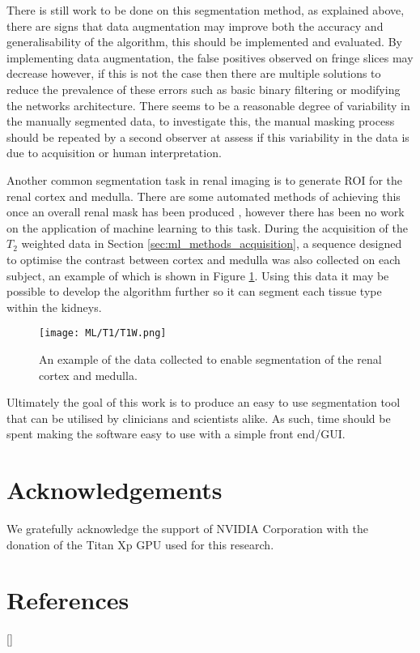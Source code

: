 There is still work to be done on this segmentation method, as explained above, there are signs that data augmentation may improve both the accuracy and generalisability of the algorithm, this should be implemented and evaluated. By implementing data augmentation, the false positives observed on fringe slices may decrease however, if this is not the case then there are multiple solutions to reduce the prevalence of these errors such as basic binary filtering or modifying the networks architecture. There seems to be a reasonable degree of variability in the manually segmented data, to investigate this, the manual masking process should be repeated by a second observer at assess if this variability in the data is due to acquisition or human interpretation.

Another common segmentation task in renal imaging is to generate \ac{ROI} for the renal cortex and medulla. There are some automated methods of achieving this once an overall renal mask has been produced \cite{cox_multiparametric_2017}, however there has been no work on the application of machine learning to this task. During the acquisition of the $T_2$ weighted data in Section \ref{sec:ml_methods_acquisition}, a sequence designed to optimise the contrast between cortex and medulla was also collected on each subject, an example of which is shown in Figure \ref{fig:ml_t1}. Using this data it may be possible to develop the algorithm further so it can segment each tissue type within the kidneys.

\begin{figure}[H]
	\centering
	\texttt{[image: ML/T1/T1W.png]}
	\caption{An example of the data collected to enable segmentation of the renal cortex and medulla.}
	\label{fig:ml_t1}
\end{figure}

Ultimately the goal of this work is to produce an easy to use segmentation tool that can be utilised by clinicians and scientists alike. As such, time should be spent making the software easy to use with a simple front end/\ac{GUI}.

\section{Acknowledgements}

We gratefully acknowledge the support of NVIDIA Corporation with the donation of the Titan Xp GPU used for this research.

\newpage
\section{References}
[\refname]{}
\printbibliography